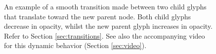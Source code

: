 \begin{figure}[h]
\centering
 \vspace{-0.5cm}
\caption{An example of a smooth transition made between two child glyphs that translate toward the new parent node. Both child glyphs decrease in opacity, whilst the new parent glyph increases in opacity. Refer to Section \ref{sec:transitions}. See also the accompanying video for this dynamic behavior (Section \ref{sec:video}).}  \label{fig:transitions}
\end{figure}

